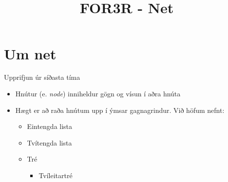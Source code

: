 \documentclass{beamer}
\title{FOR3R - Net}
\begin{document}
\begin{frame}
\titlepage
\end{frame}

\section{Um net}

\begin{frame}{Upprifjun úr síðasta tíma}
\begin{itemize}
 \item Hnútur (e. \emph{node}) inniheldur gögn og vísun í aðra hnúta
 \item Hægt er að raða hnútum upp í ýmsar gagnagrindur. Við höfum nefnt:
 \begin{itemize}
  \item Eintengda lista
  \item Tvítengda lista
  \item Tré
  \begin{itemize}
   \item Tvíleitartré
  \end{itemize}
 \end{itemize}
\end{itemize}
\end{frame}
\end{document}
